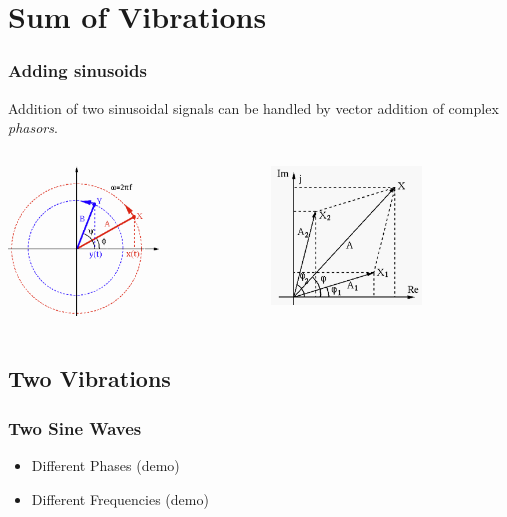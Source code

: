 \documentclass[pdf,hideothersubsections]{beamer}
\begin{document}

\section{Sum of Vibrations}
\begin{frame}
\frametitle{Adding sinusoids}
Addition of two sinusoidal signals can be handled by vector addition of complex \emph{phasors}.
\pause
\begin{columns}[T]
  \begin{column}{0.5\textwidth}
    \begin{centering}
      \includegraphics[width=4cm]{RotatingVectors2.png}
    \end{centering}
  \end{column}
  \pause
  \begin{column}{0.5\textwidth}
    \begin{centering}
      \includegraphics[width=4cm]{phasoraddition1a.png}
    \end{centering}
  \end{column}

\end{columns}

\end{frame}

\subsection{Two Vibrations}
\begin{frame}
\frametitle{Two Sine Waves}

\begin{itemize}
\item Different Phases (demo)
\item Different Frequencies (demo)
\end{itemize}

\end{frame}
\end{document}
